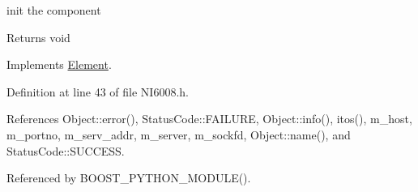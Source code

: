 init the component

\begin{DoxyReturn}{Returns}
void 
\end{DoxyReturn}


Implements \hyperlink{classElement_af42754b5cabc198869222725218d695c}{Element}.



Definition at line 43 of file N\+I6008.\+h.



References Object\+::error(), Status\+Code\+::\+F\+A\+I\+L\+U\+RE, Object\+::info(), itos(), m\+\_\+host, m\+\_\+portno, m\+\_\+serv\+\_\+addr, m\+\_\+server, m\+\_\+sockfd, Object\+::name(), and Status\+Code\+::\+S\+U\+C\+C\+E\+SS.



Referenced by B\+O\+O\+S\+T\+\_\+\+P\+Y\+T\+H\+O\+N\+\_\+\+M\+O\+D\+U\+L\+E().


